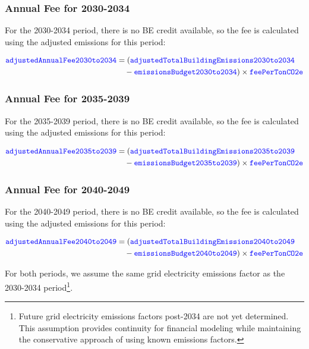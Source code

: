\documentclass{article}
\newcommand{\code}[1]{\textcolor{blue}{\texttt{#1}}}
\begin{document}
\subsubsection{Annual Fee for 2030-2034}

For the 2030-2034 period, there is no BE credit available, so the fee is calculated using the adjusted emissions for this period:

\begin{align}
\code{adjustedAnnualFee2030to2034} &= (\code{adjustedTotalBuildingEmissions2030to2034} \nonumber\\
&\quad - \code{emissionsBudget2030to2034}) \times \code{feePerTonCO2e}
\end{align}

\subsubsection{Annual Fee for 2035-2039}

For the 2035-2039 period, there is no BE credit available, so the fee is calculated using the adjusted emissions for this period:

\begin{align}
\code{adjustedAnnualFee2035to2039} &= (\code{adjustedTotalBuildingEmissions2035to2039} \nonumber\\
&\quad - \code{emissionsBudget2035to2039}) \times \code{feePerTonCO2e}
\end{align}

\subsubsection{Annual Fee for 2040-2049}

For the 2040-2049 period, there is no BE credit available, so the fee is calculated using the adjusted emissions for this period:

\begin{align}
\code{adjustedAnnualFee2040to2049} &= (\code{adjustedTotalBuildingEmissions2040to2049} \nonumber\\
&\quad - \code{emissionsBudget2040to2049}) \times \code{feePerTonCO2e}
\end{align}

For both periods, we assume the same grid electricity emissions factor as the 2030-2034 period\footnote{Future grid electricity emissions factors post-2034 are not yet determined. This assumption provides continuity for financial modeling while maintaining the conservative approach of using known emissions factors.}.
\end{document}
